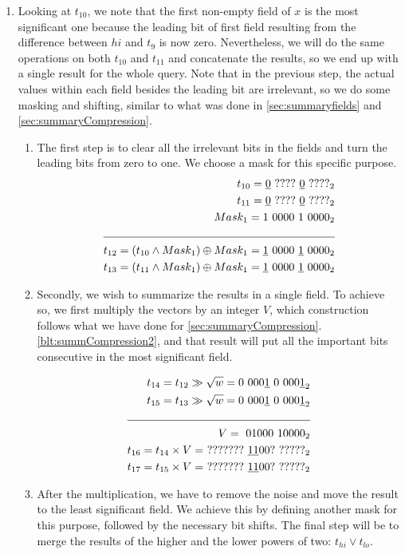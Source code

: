 \begin{enumerate}
    \item \label{blt:parallel4}
    Looking at $t_{10}$, we note that the first non-empty field of $x$ is the most significant one because the leading bit of first field resulting from the difference between $hi$ and $t_9$ is now zero. Nevertheless, we will do the same operations on both $t_{10}$ and $t_{11}$ and concatenate the results, so we end up with a single result for the whole query. Note that in the previous step, the actual values within each field besides the leading bit are irrelevant, so we do some masking and shifting, similar to what was done in \ref{sec:summaryfields} and \ref{sec:summaryCompression}.
    \begin{enumerate}
        \item
        The first step is to clear all the irrelevant bits in the fields and turn the leading bits from zero to one. We choose a mask for this specific purpose.
        \begin{align*}
            t_{10} = \underline{0}\ ????\ \underline{0}\ ????_2&\\
            t_{11} = \underline{0}\ ????\ \underline{0}\ ????_2&\\
            Mask_1 = 1\ 0000\ 1\ 0000_2&\\ \cline{1-2}
            t_{12} = (t_{10} \wedge Mask_1) \oplus Mask_1 = \underline{1}\ 0000\ \underline{1}\ 0000_2&\\
            t_{13} = (t_{11} \wedge Mask_1) \oplus Mask_1 = \underline{1}\ 0000\ \underline{1}\ 0000_2&
        \end{align*}
        \item
        Secondly, we wish to summarize the results in a single field. To achieve so, we first multiply the vectors by an integer $V$, which construction follows what we have done for \ref{sec:summaryCompression}.\ref{blt:summCompression2}, and that result will put all the important bits consecutive in the most significant field.
        
        \begin{align*}
            t_{14} = t_{12} \gg \sqrt{w} = 0\ 000\underline{1}\ 0\ 000\underline{1}_2& \\
            t_{15} = t_{13} \gg \sqrt{w} = 0\ 000\underline{1}\ 0\ 000\underline{1}_2& \\
            \cline{1-2}
            V =\ 01000\ 10000_2 & \\
            t_{16} = t_{14} \times V =\ ???????\ \underline{11}00?\ ?????_2& \\
            t_{17} = t_{15} \times V =\ ???????\ \underline{11}00?\ ?????_2& \\
        \end{align*}
        \item
        After the multiplication, we have to remove the noise and move the result to the least significant field. We achieve this by defining another mask for this purpose, followed by the necessary bit shifts. The final step will be to merge the results of the higher and the lower powers of two: $t_{hi} \vee t_{lo}$.
        

\end{enumerate}
\end{enumerate}
